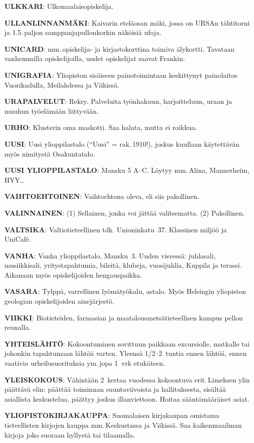 \documentclass[../ala_hataile.tex]{subfiles}
\begin{document}
\textbf{ULKKARI}: Ulkomaalaisopiskelija.

\textbf{ULLANLINNANMÄKI}: Kaivarin eteläosan
mäki, jossa on URSAn tähtitorni ja
1.5.\,paljon samppanjapullonkorkin näköisiä
ufoja.

\textbf{UNICARD}: mm.\,opiskelija- ja kirjastokorttina
toimiva älykortti. Tavataan vanhemmilla
opiskelijoilla, uudet opiskelijat
saavat Frankin.

\textbf{UNIGRAFIA}: Yliopiston sisäiseen painotoimintaan
keskittynyt painolaitos Vuorikadulla,
Meilahdessa ja Viikissä.

\textbf{URAPALVELUT}: Rekry. Palveluita
työnhakuun, harjoitteluun, uraan ja muuhun
työelämään liittyvään.

\textbf{URHO}: Klusterin oma maskotti. Saa halata,
mutta ei roikkua.

\textbf{UUSI}: Uusi ylioppilastalo (``Uusi'' = rak.\,1910!), joskus kuullaan käytettävän myös
nimitystä Osakuntatalo.

\textbf{UUSI YLIOPPILASTALO}: Mansku
5 A--C. Löytyy mm.\,Alina, Mannerheim,
HYY\dots

\textbf{VAIHTOEHTOINEN}: Vaihtoehtona oleva, eli siis pakollinen.

\textbf{VALINNAINEN}: (1) Sellainen, jonka voi jättää valitsematta. (2) Pakollinen.

\textbf{VALTSIKA}: Valtiotieteellinen tdk. Unioninkatu~37. Klassinen miljöö ja UniCafé.

\textbf{VANHA}: Vanha ylioppilastalo, Mansku~3.
Uuden vieressä: juhlasali, musiikkisali, yritystapahtumia,
bileitä, klubeja, vuosijuhlia,
Kuppila ja terassi. Aikanaan myös opiskelijoiden
hengauspaikka.

\textbf{VASARA}: Tylppä, varrellinen lyömätyökalu,
astalo. Myös Helsingin yliopiston
geologian opiskelijoiden ainejärjestö.

\textbf{VIIKKI}: Biotieteiden, farmasian ja maatalousmetsätieteellisen
kampus pellon reunalla.

\textbf{YHTEISLÄHTÖ}: Kokoontuminen sovittuun
paikkaan excursiolle, matkalle tai johonkin
tapahtumaan lähtöä varten. Yleensä
1/2--2~tuntia ennen lähtöä, ennen vaativia urheilusuorituksia ym.\,jopa 1~vrk etukäteen.

\textbf{YLEISKOKOUS}: Vähintään 2~kertaa
vuodessa kokoontuva erit.\,Limeksen ylin
päättävä elin: päättää toiminnan suuntaviivoista
ja hallituksesta, sisältää asiallista
keskustelua, päättyy joskus illanviettoon.
Hoitaa sääntömääräiset asiat.

\textbf{YLIOPISTOKIRJAKAUPPA}: Suomalaisen
kirjakaupan omistama tieteellisten
kirjojen kauppa mm.\,Keskustassa ja Viikissä.
Saa kaikenmaailman kirjoja joko suoraan
hyllystä tai tilaamalla.
\end{document}
